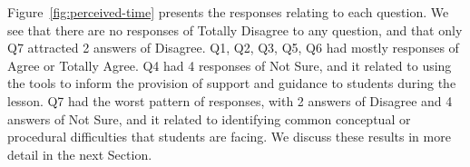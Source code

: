 Figure~\ref{fig:perceived-time} presents the responses relating to each
question. We 
see that there are no responses of Totally Disagree to any question,
and that only Q7 attracted 2 answers of Disagree. Q1, Q2, Q3, Q5, Q6
had mostly responses of Agree or Totally Agree. Q4 had 4 responses of
Not Sure, and it related to using the tools to inform the provision of
support and guidance to students during the lesson. Q7 had the worst
pattern of responses, with 2 answers of Disagree and 4 answers of Not
Sure, and it related to identifying common conceptual or procedural
difficulties that students are facing. We discuss these results in
more detail in the next Section.




